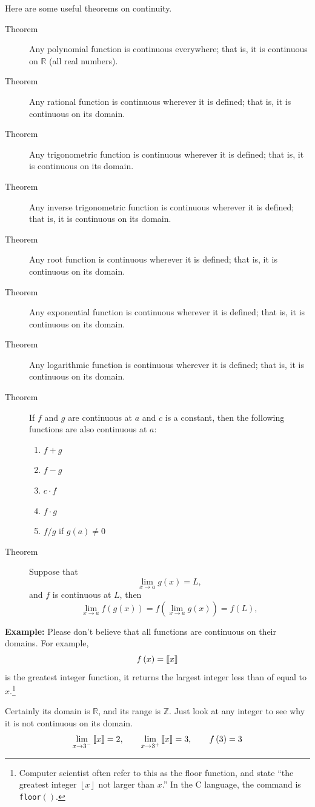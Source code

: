 \documentclass[12pt,addpoints, answers, fleqn]{exam}
\begin{document}
Here are some useful theorems on continuity.
\begin{description}
\item[Theorem] Any polynomial function is continuous everywhere; that is, it is continuous on $\mathbb{R}$ (all real numbers).
\item[Theorem] Any rational function is continuous wherever it is defined; that is, it is continuous on its domain.
\item[Theorem] Any trigonometric function is continuous wherever it is defined; that is, it is continuous on its domain.
\item[Theorem] Any inverse trigonometric function is continuous wherever it is defined; that is, it is continuous on its domain.
\item[Theorem] Any root function is continuous wherever it is defined; that is, it is continuous on its domain.
\item[Theorem] Any exponential function is continuous wherever it is defined; that is, it is continuous on its domain.
\item[Theorem] Any logarithmic function is continuous wherever it is defined; that is, it is continuous on its domain.
\item[Theorem] If $f$ and $g$ are continuous at $a$ and $c$ is a constant, then the following functions are also continuous at $a$:
\begin{enumerate}
\item $f+g$
\item $f-g$
\item $c \cdot f$
\item $f \cdot g$
\item $f/g$ if $g\left( a \right) \neq 0$
\end{enumerate}
\item[Theorem] Suppose that
\[
\mathop {\lim }\limits_{x \to a }  g \left( x \right) = L,
\]
and $f$ is continuous at $L$, then
\[
\mathop {\lim }\limits_{x \to a }  f \left( g \left( x \right) \right)=  f \left( \mathop {\lim }\limits_{x \to a }  g \left( x \right) \right)= f \left(L\right),
\]
\end{description}

\textbf{Example:} Please don't believe that all functions are continuous on their domains. For example,
\[
f \left( x \right) = \left[\kern-0.15em\left[ x 
 \right]\kern-0.15em\right]
\]
is the greatest integer function, it returns the largest integer less than of equal to $x$.\footnote{Computer scientist often refer to this as the floor function, and state ``the greatest integer $\left\lfloor x \right\rfloor $ not larger than $x$.'' In the C language, the command is \texttt{floor}$\left(\right)$.}
\begin{solution}
Certainly its domain is $\mathbb{R}$, and its range is $\mathbb{Z}$. Just look at any integer to see why it is not continuous on its domain.
\[
\mathop {\lim }\limits_{x \to 3^-} \left[\kern-0.15em\left[ x 
 \right]\kern-0.15em\right] = 2, \qquad 
\mathop {\lim }\limits_{x \to 3^+} \left[\kern-0.15em\left[ x 
 \right]\kern-0.15em\right] = 3, \qquad f\left( 3 \right) = 3
\]
\end{solution}
\end{document}
